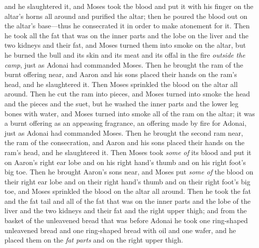 \begin{biblechapter}
\verse and he slaughtered it, and Moses took the blood and put it with his finger on the altar’s horns all around and purified the altar; then he poured the blood out on the altar’s base—thus he consecrated it in order to make atonement for it.
\verse Then he took all the fat that was on the inner parts and the lobe on the liver and the two kidneys and their fat, and Moses turned them into smoke on the altar,
\verse but he burned the bull and its skin and its meat and its offal in the fire \textit{outside the camp}, just as Adonai had commanded Moses.
\verse Then he brought the ram of the burnt offering near, and Aaron and his sons placed their hands on the ram’s head,
\verse and he slaughtered it. Then Moses sprinkled the blood on the altar all around.
\verse Then he cut the ram into pieces, and Moses turned into smoke the head and the pieces and the suet,
\verse but he washed the inner parts and the lower leg bones with water, and Moses turned into smoke all of the ram on the altar; it was a burnt offering as an appeasing fragrance, an offering made by fire for Adonai, just as Adonai had commanded Moses.
\verse Then he brought the second ram near, the ram of the consecration, and Aaron and his sons placed their hands on the ram’s head,
\verse and he slaughtered it. Then Moses took \textit{some of} its blood and put it on Aaron’s right ear lobe and on his right hand’s thumb and on his right foot’s big toe.
\verse Then he brought Aaron’s sons near, and Moses put \textit{some of} the blood on their right ear lobe and on their right hand’s thumb and on their right foot’s big toe, and Moses sprinkled the blood on the altar all around.
\verse Then he took the fat and the fat tail and all of the fat that was on the inner parts and the lobe of the liver and the two kidneys and their fat and the right upper thigh;
\verse and from the basket of the unleavened bread that was before Adonai he took one ring-shaped unleavened bread and one ring-shaped bread with oil and one wafer, and he placed them on the \textit{fat parts} and on the right upper thigh.

\end{biblechapter}
